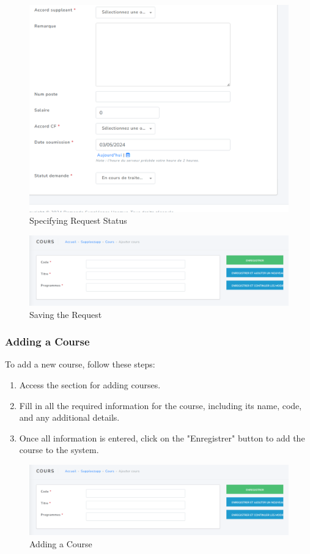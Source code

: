 \documentclass[12pt]{article}
\begin{document}
\begin{figure}[H]
    \centering
    \includegraphics[width=0.75\linewidth]{image52.png}
    \caption{Specifying Request Status}
\end{figure}

\begin{figure}[H]
    \centering
    \includegraphics[width=0.75\linewidth]{image54.png}
    \caption{Saving the Request}
\end{figure}

\subsubsection{Adding a Course}

To add a new course, follow these steps:

\begin{enumerate}\label{13}
    \item Access the section for adding courses.
    \item Fill in all the required information for the course, including its name, code, and any additional details.
    \item Once all information is entered, click on the "Enregistrer" button to add the course to the system.
\end{enumerate}

\begin{figure}[H]
    \centering
    \includegraphics[width=0.75\linewidth]{image54.png}
    \caption{Adding a Course}
\end{figure}
\end{document}
